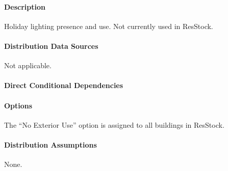 \paragraph{Description}
% 
Holiday lighting presence and use. Not currently used in ResStock.

\paragraph{Distribution Data Sources}
% 
Not applicable. 

\paragraph{Direct Conditional Dependencies}


\paragraph{Options}
The ``No Exterior Use'' option is assigned to all buildings in ResStock.

\paragraph{Distribution Assumptions}
% 
None. 
